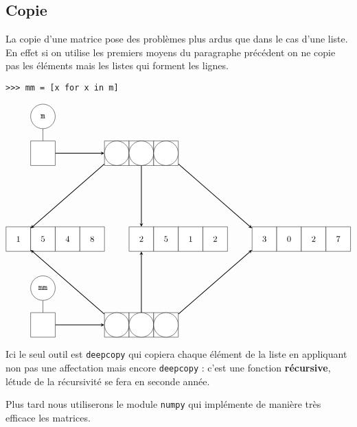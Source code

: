 \subsection{Copie}
La copie d'une matrice pose des problèmes plus ardus que dans le cas d'une liste.
En effet si on utilise les premiers moyens du paragraphe précédent on ne copie pas les éléments mais les listes qui forment les lignes.

\begin{lstlisting}
>>> mm = [x for x in m]
\end{lstlisting}

$$\tikzpicture
 \tikzstyle{every node}=[draw,minimum size =10mm,fill=white]
 \node[circle] (m) {\tt m}
  child {node[rectangle](l){}};
 \node[rectangle](l0) at (3,-1.5) {};
 \node[circle](ll0) at (3,-1.5) {};
 \node[rectangle](l1) at (4,-1.5) {};
 \node[circle](ll1) at (4,-1.5) {};
 \node[rectangle](l2) at (5,-1.5) {};
 \node[circle](ll2) at (5,-1.5) {};
 \draw [thick,-stealth] (l) -- (l0);
 \node[rectangle](m20) at (9,-5) {3};
 \node[rectangle](m21) at (10,-5) {0};
 \node[rectangle](m22) at (11,-5) {2};
 \node[rectangle](m23) at (12,-5) {7};
 \draw [thick,-stealth] (l2) -- (m20);
 \node[rectangle](m10) at (4,-5) {2};
 \node[rectangle](m11) at (5,-5) {5};
 \node[rectangle](m12) at (6,-5) {1};
 \node[rectangle](m13) at (7,-5) {2};
 \draw [thick,-stealth] (l1) -- (m10);
 \node[rectangle](m00) at (-1,-5) {1};
 \node[rectangle](m01) at (0,-5) {5};
 \node[rectangle](m02) at (1,-5) {4};
 \node[rectangle](m03) at (2,-5) {8};
 \draw [thick,-stealth] (l0) -- (m00);
 \node[circle] (mm) at (0,-7) {\tt mm}
  child {node[rectangle](r){}};
 \node[rectangle](r0) at (3,-8.5) {};
 \node[circle](rr0) at (3,-8.5) {};
 \node[rectangle](r1) at (4,-8.5) {};
 \node[circle](rr1) at (4,-8.5) {};
 \node[rectangle](r2) at (5,-8.5) {};
 \node[circle](rr2) at (5,-8.5) {};
 \draw [thick,-stealth] (r) -- (r0);
 \draw [thick,-stealth] (r2) -- (m20);
 \draw [thick,-stealth] (r1) -- (m10);
 \draw [thick,-stealth] (r0) -- (m00);
 \endtikzpicture
$$

Ici le seul outil est \lstinline?deepcopy? qui copiera chaque élément de la liste en appliquant non pas une affectation mais encore \lstinline?deepcopy? : c'est une fonction \textbf{récursive}, létude de la récursivité se fera en seconde année.

\vskip 2cm

Plus tard nous utiliserons le module \lstinline?numpy? qui implémente de manière très efficace les matrices.

